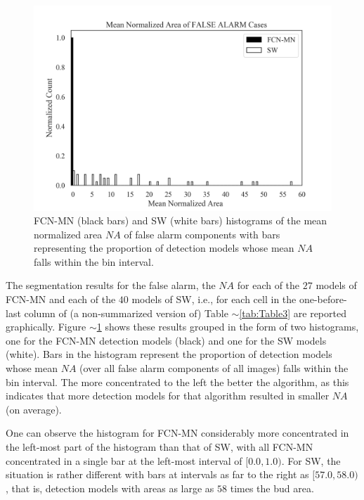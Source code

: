 \documentclass[a4paper,authoryear,review]{elsarticle}
\begin{document}
	
	
	
	
	
	
	
	\begin{figure}%
		\centering
		\includegraphics[width=\textwidth]{figures/AAA_mean_relative_area_fcn_vs_sw.png}%
		\caption{
			FCN-MN (black bars) and SW (white bars) histograms of the mean normalized area $NA$ of false alarm components with bars representing the proportion of detection models whose mean $NA$ falls within the bin interval.
		}
		\label{fig:Figure6}
	\end{figure}
	
	
	The segmentation results for the false alarm, the $NA$  for each of the $27$ models of FCN-MN and each of the $40$ models of SW, i.e., for each cell in the  one-before-last column of (a non-summarized version of) Table $\sim$\ref{tab:Table3} are reported graphically. Figure $\sim$\ref{fig:Figure6} shows these results grouped in the form of two histograms, one for the FCN-MN detection models (black) and one for the SW models  (white). Bars in the histogram represent the proportion of detection models whose mean $NA$ (over all false alarm components of all images) falls within the bin interval. The more concentrated to the left the better the algorithm, as this indicates that more detection models for that algorithm resulted in smaller $NA$ (on average).
	
	One can observe the histogram for FCN-MN considerably more concentrated in the left-most part of the histogram than that of SW, with all FCN-MN concentrated in a single bar at the left-most interval of $[0.0, 1.0)$. For SW, the situation is rather different with bars at intervals as far to the right as $[57.0, 58.0)$, that is, detection models with areas as large as $58$ times the bud area. 
	
\end{document}
